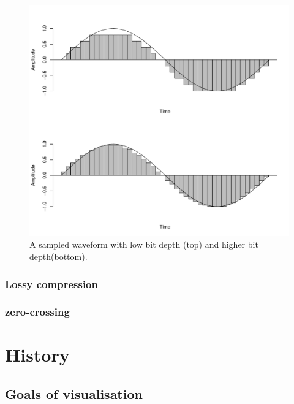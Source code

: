 \documentclass[
]{book}
\begin{document}
\begin{figure}

{\centering \includegraphics[width=0.9\linewidth]{_main_files/figure-latex/sampled-wave-1} 

}

\caption{A sampled waveform with low bit depth (top) and higher bit depth(bottom).}\label{fig:sampled-wave}
\end{figure}

\hypertarget{lossy-compression}{%
\subsection{Lossy compression}\label{lossy-compression}}

\hypertarget{zero-crossing-files}{%
\subsection{zero-crossing}\label{zero-crossing-files}}

\hypertarget{history}{%
\chapter{History}\label{history}}

\hypertarget{goals-of-visualisation}{%
\section{Goals of visualisation}\label{goals-of-visualisation}}
\end{document}
